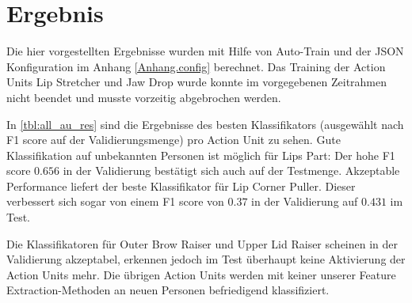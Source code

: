 \chapter{Ergebnis}\label{ch:ergebnis}
Die hier vorgestellten Ergebnisse wurden mit Hilfe von Auto-Train und der JSON
Konfiguration im Anhang \ref{Anhang.config} berechnet. Das Training der Action Units Lip Stretcher
und Jaw Drop wurde konnte im vorgegebenen Zeitrahmen nicht beendet und musste vorzeitig
abgebrochen werden.



In \cref{tbl:all_au_res} sind die Ergebnisse des besten Klassifikators
(ausgewählt nach F1 score auf der Validierungsmenge) pro Action Unit zu sehen.
Gute Klassifikation auf unbekannten Personen ist möglich für Lips Part: Der hohe
F1 score $0.656$ in der Validierung bestätigt sich auch auf der Testmenge. Akzeptable
Performance liefert der beste Klassifikator für Lip Corner Puller. Dieser
verbessert sich sogar von einem F1 score von $0.37$ in der Validierung auf
$0.431$ im Test.

Die Klassifikatoren für Outer Brow Raiser und Upper Lid Raiser scheinen in der
Validierung akzeptabel, erkennen jedoch im Test überhaupt keine Aktivierung der
Action Units mehr. Die übrigen Action Units werden mit keiner unserer Feature
Extraction-Methoden an neuen Personen befriedigend klassifiziert.

